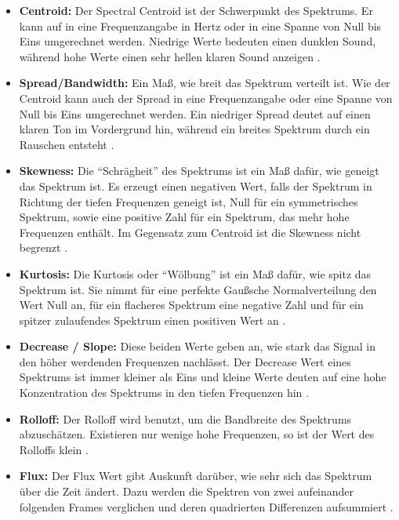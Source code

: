 \documentclass[11pt,a4paper]{article}
\begin{document}
\begin{itemize}
\item \textbf{Centroid:} Der Spectral Centroid ist der Schwerpunkt des Spektrums. Er kann auf in eine Frequenzangabe in Hertz oder in eine Spanne von Null bis Eins umgerechnet werden. Niedrige Werte bedeuten einen dunklen Sound, während hohe Werte einen sehr hellen klaren Sound anzeigen \cite[S. 45 f.]{lerch2012introduction}.

\item \textbf{Spread/Bandwidth:} Ein Maß, wie breit das Spektrum verteilt ist. Wie der Centroid kann auch der Spread in eine Frequenzangabe oder eine Spanne von Null bis Eins umgerechnet werden. Ein niedriger Spread deutet auf einen klaren Ton im Vordergrund hin, während ein breites Spektrum durch ein Rauschen entsteht \cite[S. 47 f.]{lerch2012introduction}.

\item \textbf{Skewness:} Die ``Schrägheit'' des Spektrums ist ein Maß dafür, wie geneigt das Spektrum ist. Es erzeugt einen negativen Wert, falls der Spektrum in Richtung der tiefen Frequenzen geneigt ist, Null für ein symmetrisches Spektrum, sowie eine positive Zahl für ein Spektrum, das mehr hohe Frequenzen enthält. Im Gegensatz zum Centroid ist die Skewness nicht begrenzt \cite[S. 38 f.]{lerch2012introduction}.

\item \textbf{Kurtosis:} Die Kurtosis oder ``Wölbung'' ist ein Maß dafür, wie spitz das Spektrum ist. Sie nimmt für eine perfekte Gaußsche Normalverteilung den Wert Null an, für ein flacheres Spektrum eine negative Zahl und für ein spitzer zulaufendes Spektrum einen positiven Wert an \cite[S. 39 f.]{lerch2012introduction}.

\item \textbf{Decrease / Slope:} Diese beiden Werte geben an, wie stark das Signal in den höher werdenden Frequenzen nachlässt. Der Decrease Wert eines Spektrums ist immer kleiner als Eins und kleine Werte deuten auf eine hohe Konzentration des Spektrums in den tiefen Frequenzen hin \cite[S. 49 f.]{lerch2012introduction}.

\item \textbf{Rolloff:} Der Rolloff wird benutzt, um die Bandbreite des Spektrums abzuschätzen. Existieren nur wenige hohe Frequenzen, so ist der Wert des Rolloffs klein \cite[S. 42 f.]{lerch2012introduction}.

\item \textbf{Flux:} Der Flux Wert gibt Auskunft darüber, wie sehr sich das Spektrum über die Zeit ändert. Dazu werden die Spektren von zwei aufeinander folgenden Frames verglichen und deren quadrierten Differenzen aufsummiert \cite[S. 44 f.]{lerch2012introduction}.


\end{itemize}
\end{document}
